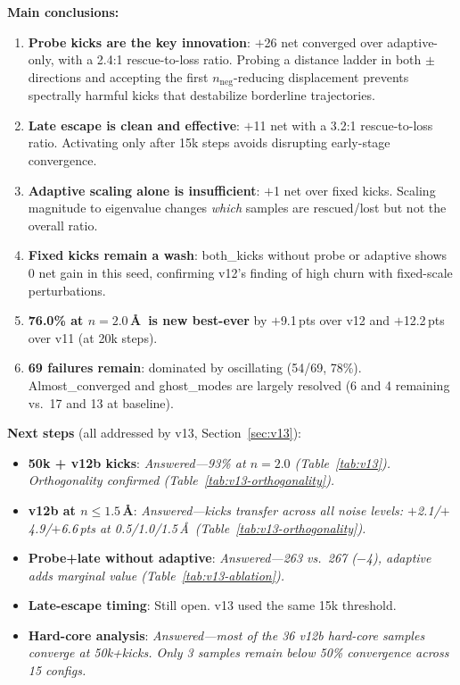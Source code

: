\documentclass[11pt,a4paper]{article}
\theoremstyle{definition}
\begin{document}
\textbf{Main conclusions:}
\begin{enumerate}[nosep]
  \item \textbf{Probe kicks are the key innovation}: $+$26 net converged
    over adaptive-only, with a 2.4:1 rescue-to-loss ratio.  Probing a
    distance ladder in both $\pm$ directions and accepting the first
    $n_\text{neg}$-reducing displacement prevents spectrally harmful
    kicks that destabilize borderline trajectories.
  \item \textbf{Late escape is clean and effective}: $+$11 net with a
    3.2:1 rescue-to-loss ratio.  Activating only after 15k steps avoids
    disrupting early-stage convergence.
  \item \textbf{Adaptive scaling alone is insufficient}: $+$1 net over
    fixed kicks.  Scaling magnitude to eigenvalue changes \emph{which}
    samples are rescued/lost but not the overall ratio.
  \item \textbf{Fixed kicks remain a wash}: both\_kicks without
    probe or adaptive shows 0 net gain in this seed, confirming v12's
    finding of high churn with fixed-scale perturbations.
  \item \textbf{76.0\% at $n=2.0$\,\AA\ is new best-ever} by
    $+$9.1\,pts over v12 and $+$12.2\,pts over v11 (at 20k steps).
  \item \textbf{69 failures remain}: dominated by oscillating (54/69,
    78\%).  Almost\_converged and ghost\_modes are largely resolved
    (6 and 4 remaining vs.\ 17 and 13 at baseline).
\end{enumerate}

\textbf{Next steps} (all addressed by v13, Section~\ref{sec:v13}):
\begin{itemize}[nosep]
  \item \textbf{50k + v12b kicks}: \emph{Answered---93\% at $n=2.0$
    (Table~\ref{tab:v13}).  Orthogonality confirmed
    (Table~\ref{tab:v13-orthogonality}).}
  \item \textbf{v12b at $n \leq 1.5$\,\AA}: \emph{Answered---kicks
    transfer across all noise levels: $+$2.1/$+$4.9/$+$6.6\,pts at
    0.5/1.0/1.5\,\AA\ (Table~\ref{tab:v13-orthogonality}).}
  \item \textbf{Probe+late without adaptive}: \emph{Answered---263 vs.\
    267 ($-$4), adaptive adds marginal value
    (Table~\ref{tab:v13-ablation}).}
  \item \textbf{Late-escape timing}: Still open.  v13 used the same
    15k threshold.
  \item \textbf{Hard-core analysis}: \emph{Answered---most of the 36
    v12b hard-core samples converge at 50k+kicks.  Only 3 samples
    remain below 50\% convergence across 15 configs.}
\end{itemize}
\end{document}
